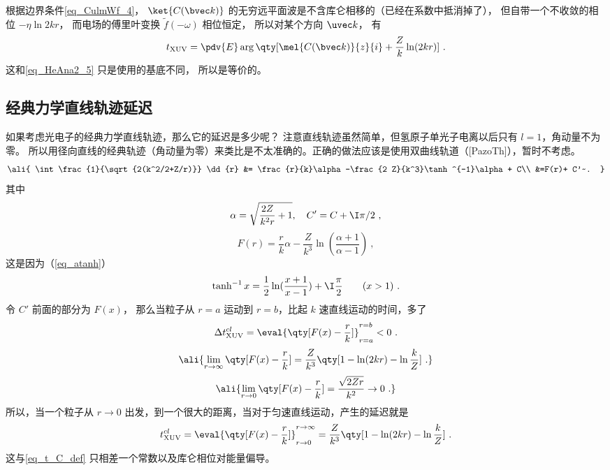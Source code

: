 根据边界条件\autoref{eq_CulmWf_4}， $\ket{C(\bvec k)}$ 的无穷远平面波是不含库仑相移的（已经在系数中抵消掉了）， 但自带一个不收敛的相位 $-\eta \ln 2kr$， 而电场的傅里叶变换 $\tilde f(-\omega)$ 相位恒定， 所以对某个方向 $\uvec k$， 有
\begin{equation}
t_\text{XUV} = \pdv{E} \arg\qty[\mel{C(\bvec k)}{z}{i} + \frac{Z}{k}\ln(2kr)]~.
\end{equation}
这和\autoref{eq_HeAna2_5} 只是使用的基底不同， 所以是等价的。

\subsection{经典力学直线轨迹延迟}
如果考虑光电子的经典力学直线轨迹，那么它的延迟是多少呢？ 注意直线轨迹虽然简单，但氢原子单光子电离以后只有 $l=1$，角动量不为零。 所以用径向直线的经典轨迹（角动量为零）来类比是不太准确的。正确的做法应该是使用双曲线轨道（[PazoTh]），暂时不考虑。
\begin{equation}\ali{
\int \frac{1}{\sqrt{2(k^2/2+Z/r)}} \dd{r} &= \frac{r}{k}\alpha-\frac{2 Z}{k^3}\tanh ^{-1}\alpha + C\\
&=F(r)+ C'~.
}\end{equation}
其中
\begin{equation}
\alpha = \sqrt{\frac{2 Z}{k^2 r}+1},
\quad C' = C + \I \pi/2~,
\end{equation}
\begin{equation}\label{eq_HeAna2_7}
F(r) = \frac{r}{k}\alpha-\frac{Z}{k^3}\ln(\frac{\alpha+1}{\alpha-1})~,
\end{equation}
这是因为（\autoref{eq_atanh}）
\begin{equation}
\tanh ^{-1} x
= \frac12 \ln(\frac{x+1}{x-1})+\I \frac{\pi}{2} \qquad (x > 1)~.
\end{equation}
令 $C'$ 前面的部分为 $F(x)$， 那么当粒子从 $r=a$ 运动到 $r=b$，比起 $k$ 速直线运动的时间，多了
\begin{equation}
\Delta t_\text{XUV}^{cl} = \eval{\qty[F(x)-\frac{r}{k}]}_{r=a}^{r=b} < 0~.
\end{equation}
\begin{equation}\ali{
\lim_{r\to \infty} \qty[F(x)-\frac{r}{k}] =
\frac{Z}{k^3}\qty[1-\ln(2k r)-\ln\frac{k}{Z}]~.
}\end{equation}
\begin{equation}\ali{
\lim_{r\to 0} \qty[F(x)-\frac{r}{k}] =
\frac{\sqrt{2Zr}}{k^2} \to 0~.
}\end{equation}
所以，当一个粒子从 $r\to 0$ 出发，到一个很大的距离，当对于匀速直线运动，产生的延迟就是
\begin{equation}
t_\text{XUV}^{cl} = \eval{\qty[F(x)-\frac{r}{k}]}_{r\to0}^{r\to\infty} = \frac{Z}{k^3}\qty[1-\ln(2kr)-\ln\frac{k}{Z}]~.
\end{equation}
这与\autoref{eq_t_C_def} 只相差一个常数以及库仑相位对能量偏导。

